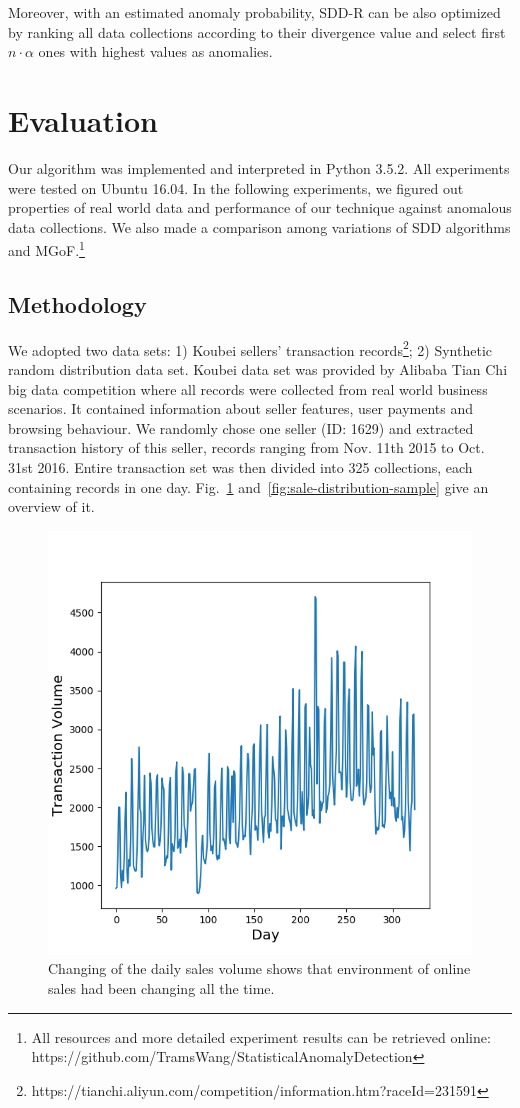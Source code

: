 \documentclass[10pt,conference,letterpaper]{article}
\begin{document}
			Moreover, with an estimated anomaly probability, SDD-R can be also optimized by ranking all data collections according to their divergence value and select first $n \cdot \alpha$ ones with highest values as anomalies.
	
	\section{Evaluation}\label{sec:evaluation}
		Our algorithm was implemented and interpreted in Python 3.5.2. All experiments were tested on Ubuntu 16.04. In the following experiments, we figured out properties of real world data and performance of our technique against anomalous data collections. We also made a comparison among variations of SDD algorithms and MGoF.\footnote{All resources and more detailed experiment results can be retrieved online: https://github.com/TramsWang/StatisticalAnomalyDetection}
	
		\subsection{Methodology}\label{sec:exp-methodology}
			We adopted two data sets: 1) Koubei sellers' transaction records\footnote{https://tianchi.aliyun.com/competition/information.htm?raceId=231591}; 2) Synthetic random distribution data set. Koubei data set was provided by Alibaba Tian Chi big data competition where all records were collected from real world business scenarios. It contained information about seller features, user payments and browsing behaviour. We randomly chose one seller (ID: 1629) and extracted transaction history of this seller, records ranging from Nov. 11th 2015 to Oct. 31st 2016. Entire transaction set was then divided into 325 collections, each containing records in one day. Fig.~\ref{fig:daily-transaction-volume} and~\ref{fig:sale-distribution-sample} give an overview of it.
			
			\begin{figure}[!t]
				\centering
				\includegraphics[width=0.75\linewidth]{fig/DailyTransactionVolume.png}
				\caption{Changing of the daily sales volume shows that environment of online sales had been changing all the time.}
				\label{fig:daily-transaction-volume}
			\end{figure}
			
\end{document}
